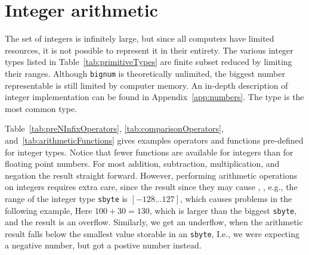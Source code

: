 \section{Integer arithmetic}
The set of integers is infinitely large, but since all computers have limited resources, it is not possible to represent it in their entirety. The various integer types listed in Table~\ref{tab:primitiveTypes} are finite subset reduced by limiting their ranges. Although \lstinline!bignum! is theoretically unlimited, the biggest number representable is still limited by computer memory. An in-depth description of integer implementation can be found in Appendix~\ref{app:numbers}. The type  is the most common type. 

Table~\ref{tab:preNInfixOperators}, \ref{tab:comparisonOperators}, and~\ref{tab:arithmeticFunctions} gives examples operators and functions pre-defined for integer types. Notice that fewer functions are available for integers than for floating point numbers. For most addition, subtraction, multiplication, and negation the result straight forward. However, performing arithmetic operations on integers requires extra care, since the result since they may cause , , e.g., the range of the integer type \lstinline|sbyte| is $[-128\ldots 127]$, which causes problems in the following example,
%
%
%
Here $100+30=130$, which is larger than the biggest \lstinline|sbyte|, and the result is an overflow. Similarly, we get an underflow, when the arithmetic result falls below the smallest value storable in an \lstinline|sbyte|,
%
%
%
I.e., we were expecting a negative number, but got a postive number instead.
%

